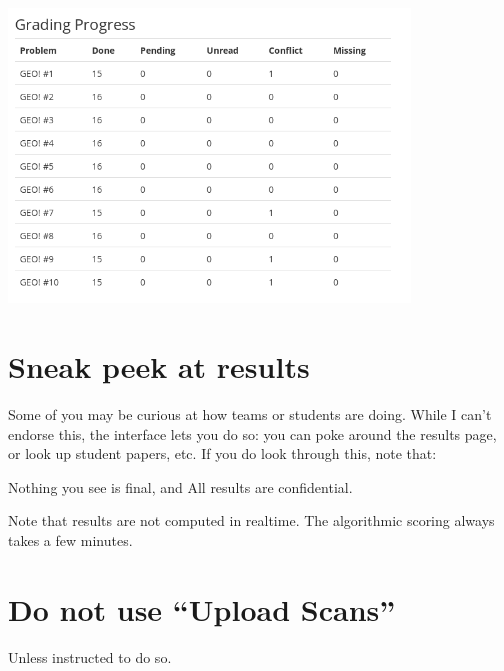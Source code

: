 \begin{center}
	\includegraphics[width=0.8\textwidth]{images/progress.png}
\end{center}


\section{Sneak peek at results}
Some of you may be curious at how teams or students are doing.
While I can't endorse this, the interface lets you do so:
you can poke around the results page,
or look up student papers, etc.
If you do look through this, note that:
\begin{itemize}
	\ii Nothing you see is final, and
	\ii All results are confidential.
\end{itemize}
Note that results are not computed in realtime.
The algorithmic scoring always takes a few minutes.

\section{Do not use ``Upload Scans''}
Unless instructed to do so.
